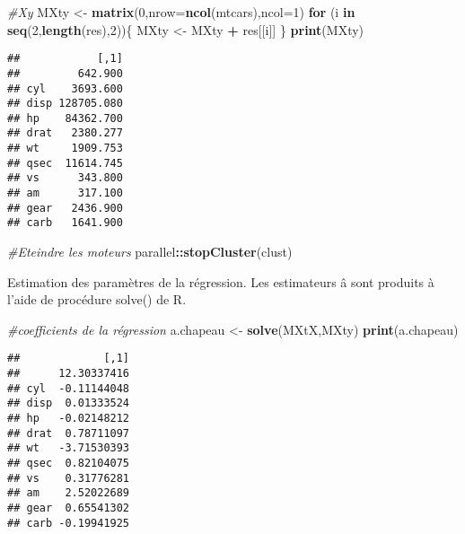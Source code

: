 \documentclass[
]{article}
\newenvironment{Shaded}{\begin{snugshade}}{\end{snugshade}}
\newcommand{\AttributeTok}[1]{\textcolor[rgb]{0.13,0.29,0.53}{#1}}
\newcommand{\CommentTok}[1]{\textcolor[rgb]{0.56,0.35,0.01}{\textit{#1}}}
\newcommand{\ControlFlowTok}[1]{\textcolor[rgb]{0.13,0.29,0.53}{\textbf{#1}}}
\newcommand{\DecValTok}[1]{\textcolor[rgb]{0.00,0.00,0.81}{#1}}
\newcommand{\FunctionTok}[1]{\textcolor[rgb]{0.13,0.29,0.53}{\textbf{#1}}}
\newcommand{\NormalTok}[1]{#1}
\newcommand{\OtherTok}[1]{\textcolor[rgb]{0.56,0.35,0.01}{#1}}
\newcommand{\SpecialCharTok}[1]{\textcolor[rgb]{0.81,0.36,0.00}{\textbf{#1}}}
\begin{document}
\begin{Shaded}
\begin{Highlighting}[]
\CommentTok{\#X\textquotesingle{}y}
\NormalTok{MXty }\OtherTok{\textless{}{-}} \FunctionTok{matrix}\NormalTok{(}\DecValTok{0}\NormalTok{,}\AttributeTok{nrow=}\FunctionTok{ncol}\NormalTok{(mtcars),}\AttributeTok{ncol=}\DecValTok{1}\NormalTok{)}
\ControlFlowTok{for}\NormalTok{ (i }\ControlFlowTok{in} \FunctionTok{seq}\NormalTok{(}\DecValTok{2}\NormalTok{,}\FunctionTok{length}\NormalTok{(res),}\DecValTok{2}\NormalTok{))\{}
\NormalTok{ MXty }\OtherTok{\textless{}{-}}\NormalTok{ MXty }\SpecialCharTok{+}\NormalTok{ res[[i]]}
\NormalTok{\}}
\FunctionTok{print}\NormalTok{(MXty)}
\end{Highlighting}
\end{Shaded}

\begin{verbatim}
##            [,1]
##         642.900
## cyl    3693.600
## disp 128705.080
## hp    84362.700
## drat   2380.277
## wt     1909.753
## qsec  11614.745
## vs      343.800
## am      317.100
## gear   2436.900
## carb   1641.900
\end{verbatim}

\begin{Shaded}
\begin{Highlighting}[]
\CommentTok{\#Eteindre les moteurs}
\NormalTok{parallel}\SpecialCharTok{::}\FunctionTok{stopCluster}\NormalTok{(clust)}
\end{Highlighting}
\end{Shaded}

Estimation des paramètres de la régression. Les estimateurs â sont
produits à l'aide de procédure solve() de R.

\begin{Shaded}
\begin{Highlighting}[]
\CommentTok{\#coefficients de la régression}
\NormalTok{a.chapeau }\OtherTok{\textless{}{-}} \FunctionTok{solve}\NormalTok{(MXtX,MXty)}
\FunctionTok{print}\NormalTok{(a.chapeau)}
\end{Highlighting}
\end{Shaded}

\begin{verbatim}
##             [,1]
##      12.30337416
## cyl  -0.11144048
## disp  0.01333524
## hp   -0.02148212
## drat  0.78711097
## wt   -3.71530393
## qsec  0.82104075
## vs    0.31776281
## am    2.52022689
## gear  0.65541302
## carb -0.19941925
\end{verbatim}
\end{document}
